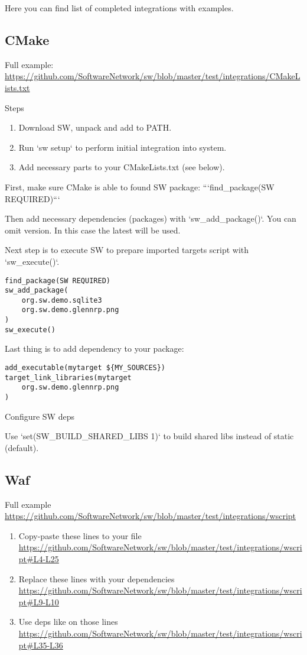Here you can find list of completed integrations with examples.

\subsection{CMake}


Full example:\\
\url{https://github.com/SoftwareNetwork/sw/blob/master/test/integrations/CMakeLists.txt}

Steps
\begin{enumerate}
\item
Download SW, unpack and add to PATH.
\item
Run `sw setup` to perform initial integration into system.
\item
Add necessary parts to your CMakeLists.txt (see below).
\end{enumerate}

First, make sure CMake is able to found SW package: ```find_package(SW REQUIRED)```

Then add necessary dependencies (packages) with `sw_add_package()`. You can omit version. In this case the latest will be used.

Next step is to execute SW to prepare imported targets script with `sw_execute()`.

\begin{verbatim}
find_package(SW REQUIRED)
sw_add_package(
    org.sw.demo.sqlite3
    org.sw.demo.glennrp.png
)
sw_execute()
\end{verbatim}

Last thing is to add dependency to your package:

\begin{verbatim}
add_executable(mytarget ${MY_SOURCES})
target_link_libraries(mytarget 
    org.sw.demo.glennrp.png
)
\end{verbatim}

Configure SW deps

Use `set(SW_BUILD_SHARED_LIBS 1)` to build shared libs instead of static (default).

\subsection{Waf}

Full example\\
\url{https://github.com/SoftwareNetwork/sw/blob/master/test/integrations/wscript}

\begin{enumerate}
\item
Copy-paste these lines to your file \url{https://github.com/SoftwareNetwork/sw/blob/master/test/integrations/wscript#L4-L25}

\item
Replace these lines with your dependencies \url{https://github.com/SoftwareNetwork/sw/blob/master/test/integrations/wscript#L9-L10}

\item
Use deps like on those lines \url{https://github.com/SoftwareNetwork/sw/blob/master/test/integrations/wscript#L35-L36}

\end{enumerate}

